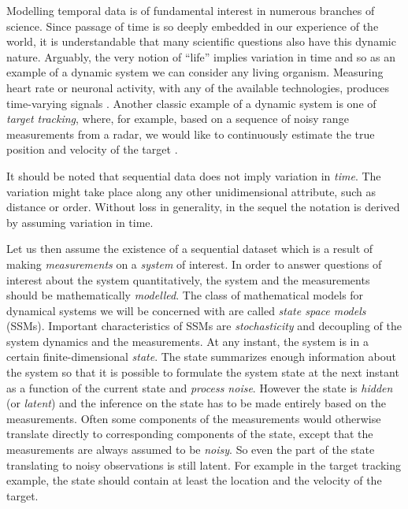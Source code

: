 Modelling temporal data is of fundamental interest in numerous branches of science.
Since passage of time is so deeply embedded in our experience of the world, 
it is understandable that many scientific questions also have this dynamic nature.
Arguably, the very notion of ``life'' implies variation in time and so 
as an example of a dynamic system we can consider any living organism.
Measuring heart rate or neuronal activity, with any of the available technologies,
produces time-varying signals \parencite{Barbieri2006,Ergun2007}. Another classic example of a dynamic system is
one of \emph{target tracking}, where, for example, based on a sequence of 
noisy range measurements from a radar, we would like to continuously 
estimate the true position and velocity of the target \parencite{bar2004estimation,Godsill2007}. 

It should be noted that sequential data does not imply variation in \emph{time}.
The variation might take place along any other unidimensional attribute,
such as distance or order. Without loss in generality, in the sequel the notation 
is derived by assuming variation in time. 

Let us then assume the existence of a sequential dataset which is a result of 
making \emph{measurements} on a \emph{system} of interest. In order to answer questions of interest
about the system quantitatively,
the system and the measurements should be mathematically \emph{modelled}. The class of mathematical
models for dynamical systems we will be concerned with are called \emph{state space models} (SSMs).
Important characteristics of SSMs are \emph{stochasticity} and decoupling of the system dynamics and the
measurements. At any instant, the system is in a certain finite-dimensional \emph{state}. The state
summarizes enough information about the system so that it is possible to formulate the system
state at the next instant as a function of the current state and \emph{process noise}.  
However the state is \emph{hidden} (or \emph{latent}) and the inference on the state has 
to be made entirely based on the measurements.  Often some components of the measurements 
would otherwise translate directly to corresponding components of the state, except that 
the measurements are always assumed to be \emph{noisy}. So even the part of the state translating 
to noisy observations is still latent.
For example in the target tracking example, the state should contain at least the location and 
the velocity of the target. 

